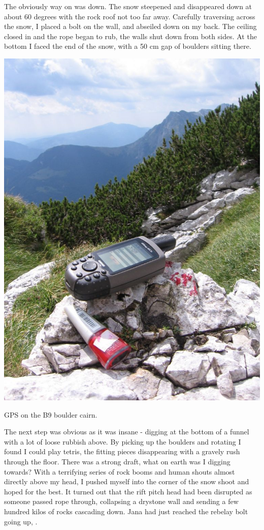 The obviously way on was down. The snow steepened and
disappeared down at about 60 degrees with the rock roof not too far
away. Carefully traversing across the snow, I placed a bolt on the wall,
and abseiled down on my back. The ceiling closed in and the rope began
to rub, the walls shut down from both sides. At the bottom I faced the
end of the snow, with a 50 cm gap of boulders sitting there.

\begin{marginfigure}
\checkoddpage \ifoddpage \forcerectofloat \else \forceversofloat \fi
\centering
 \includegraphics[width=\linewidth]{2007/b9/jarvist frost - b9 boulder cairn gps--orig.jpg} 
 \caption{GPS on the B9 boulder cairn. }
\end{marginfigure}


The next step was obvious as it was insane - digging at the bottom of a
funnel with a lot of loose rubbish above. By picking up the boulders and
rotating I found I could play tetris, the fitting pieces disappearing
with a gravely rush through the floor. There was a strong draft, what on
earth was I digging towards? With a terrifying series of rock booms and
human shouts almost directly above my head, I pushed myself into the
corner of the snow shoot and hoped for the best. It turned out that the
rift pitch head had been disrupted as someone passed rope through,
collapsing a drystone wall and sending a few hundred kilos of rocks
cascading down. Jana had just reached the rebelay bolt going up,
.

